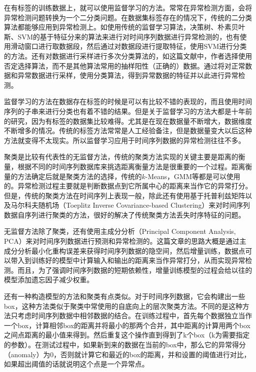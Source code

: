 在有标签的训练数据上，就可以使用监督学习的方法。常常在异常检测方面，会将异常检测问题转换为一个二分类问题\cite{gupta2013outlier}。在数据集标签存在的情况下，传统的二分类算法都能够应用到异常检测上。如使用传统的监督学习算法，决策树、朴素贝叶斯、SVM的基于特征分来的算法来进行对时间序列数据进行异常检测的\cite{kang2005learning}，也有使用滑动窗口进行取数据段，然后通过对数据段进行提取特征，使用SVM进行分类的方法\cite{tian2007sequence,wang2006native}。还有对数据进行采样进行多次分类算法的，如这篇文献\cite{gonzalez2003anomaly}中，作者选择使用否定选择算法，而不是其他算法常用的抽样阳性（正确的）数据。通过将对正常数据和异常数据进行采样，使用分类算法，得到异常数据的特征并以此进行异常检测。

监督学习的方法在数据存在标签的时候是可以有比较不错的表现的，而且使用时间序列的子串来进行分类也有着不错的结果\cite{le2017time}。但是关于监督学习的方法大都是十年前的研究，因为有标签的数据集比较难得。尤其是在现在数据量不断增大，数据维度不断增多的情况。传统的标签方法常常是人工经验备注，但是数据量变大以后这种方法就变得不太现实。所以监督学习应用于时间序列数据的异常检测往往不多。

聚类是比较有代表性的无监督方法，传统的聚类方法实现的关键主要是距离的衡量，根据不同的时间序列数据库来挑选距离衡量方法是很重要的一个过程\cite{mori2015similarity}。距离衡量的方法确定后就是聚类方法的选择，传统的\(k\)-Means，GMM等都是可以使用的。异常检测过程主要就是判断数据点到它所属中心的距离来当作它的异常打分。但是，传统的聚类方法在时间序列上表现一般，除此还有使用基于托普利兹矩阵以及马尔科夫随机场（Toeplitz Inverse Covariance-based Clustering）来对时间序列数据自序列进行聚类的方法\cite{hallac2017toeplitz}，很好的解决了传统聚类方法丢失时序特征的问题。

无监督方法除了聚类，还有使用主成分分析（Principal Component Analysis, PCA）来对时间序列数据进行预测和异常检测的\cite{papadimitriou2005streaming}。这篇文章的思路大概是通过主成分分析最小化重构误差来获得时间序列数据的隐空间，然后增量训练，数据点可以带入到训练好的模型中计算输入和输出的距离来当作异常打分，从而实现异常检测。而且，为了强调时间序列数据的短期依赖性，增量训练模型的过程会给以往的模型添加遗忘因子减少权重。

还有一种构造模型的方法和聚类有点类似\cite{chan2005modeling}。对于时间序列数据，它会构建出一些box，这种方法类似于聚类中常使用的自底向上的层次聚类方法。不同的是这种方法只考虑时间序列数据中相邻数据的结合。在训练过程中，首先每个数据独立当作一个box，计算相邻box的距离并将最小的那两个合并，其中距离的计算用两个box之间点距离的最小值来得到。然后重复这个操作直到得到了k个box（k为需要指定的参数）。在测试过程中，如果新到来的数据在当前的box中，那么它的异常得分（anomaly）为0，否则就计算它和最近的box的距离，并和设置的阈值进行对比，如果超出阈值的话就说明这个点是一个异常点。


